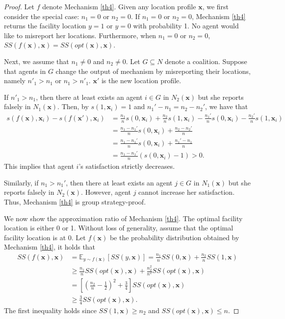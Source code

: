 \documentclass[runningheads]{11llncst}
\begin{document}
\begin{proof}
	Let $f$ denote Mechanism \ref{th4}. Given any location profile $\textbf{x}$,  we first consider the special case: $n_1=0$ or $n_2=0$. If $n_1=0$ or $n_2=0$, Mechanism \ref{th4} returns the facility location $y=1$ or $y=0$ with probability 1. No agent would like to misreport her locations. Furthermore, when $n_1=0$ or $n_2=0$, $SS(f(\textbf{x}),\textbf{x})=SS(opt(\textbf{x}),\textbf{x})$.
    
    Next, we assume that $n_1\neq0$ and $n_2\neq0$. Let $G\subseteq N$ denote a coalition. Suppose that agents in $G$ change the output of mechanism by misreporting their locations, namely  $n'_1>n_1$ or $n_1>n'_1$. $\textbf{x}'$ is the new location profile.
    
    If $n'_1>n_1$, then there at least exists an agent $i\in G$ in $N_2(\textbf{x})$ but she reports falsely in $N_1(\textbf{x})$. Then, by $s(1,\textbf{x}_i)=1$ and $n_1'-n_1=n_2-n_2'$, we have that 
    \begin{equation*}
      \begin{aligned}
          s(f(\textbf{x}),\textbf{x}_i)-s(f(\textbf{x}'),\textbf{x}_i)&=\frac{n_1}{n}s(0,\textbf{x}_i)+\frac{n_2}{n}s(1,\textbf{x}_i)-\frac{n_1'}{n}s(0,\textbf{x}_i)-\frac{n_2'}{n}s(1,\textbf{x}_i)\\
          &=\frac{n_1-n_1'}{n}s(0,\textbf{x}_i)+\frac{n_2-n_2'}{n}\\
          &=\frac{n_1-n_1'}{n}s(0,\textbf{x}_i)+\frac{n_1'-n_1}{n}\\
          &=\frac{n_1-n_1'}{n}(s(0,\textbf{x}_i)-1)>0. 
      \end{aligned}  
 \end{equation*}
This implies that agent $i$'s satisfaction strictly decreases. 

Similarly, if $n_1>n_1'$, then there at least exists an agent $j\in G$  in $N_1(\textbf{x})$ but she reports falsely in $N_2(\textbf{x})$. However, agent $j$ cannot increase her satisfaction.  Thus, Mechanism \ref{th4} is group strategy-proof. 
    
    We now show the approximation ratio of Mechanism \ref{th4}. The optimal facility location is either 0 or 1. Without loss of generality, assume that the optimal facility location is at 0. Let  $f(\textbf{x})$ be the probability distribution obtained by Mechanism \ref{th4}, it holds that 
	\begin{equation*}
		\begin{aligned}
			SS(f(\textbf{x}),\textbf{x})&=\mathbb{E}_{y\sim f(\textbf{x})}[SS(y,\textbf{x})]=\frac{n_1}{n} SS(0,\textbf{x})+\frac{n_2}{n} SS(1,\textbf{x})\\
            &\geq  \frac{n_1}{n} SS(opt(\textbf{x}),\textbf{x})+ \frac{n^2_2}{n^2}SS(opt(\textbf{x}),\textbf{x})\\
			&=\left[\left(\frac{n_2}{n}-\frac{1}{2}\right)^2+\frac{3}{4}\right]SS(opt(\textbf{x}),\textbf{x})\\
            &\geq\frac{3}{4}SS(opt(\textbf{x}),\textbf{x}).
		\end{aligned}
	\end{equation*}
     The first inequality holds since $SS(1,\textbf{x})\geq n_2$ and $SS(opt(\textbf{x}),\textbf{x})\leq n$. 
    

\end{proof}
\end{document}
